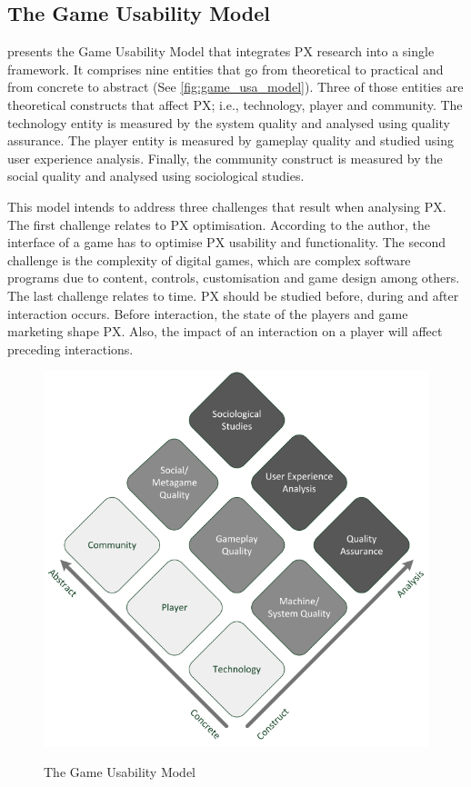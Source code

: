 \subsection{The Game Usability Model}
\textcite{Nacked} presents the Game Usability Model that integrates \ac{PX} research into a single framework. It comprises nine entities that go from theoretical to practical and from concrete to abstract (See \autoref{fig:game_usa_model}). Three of those entities are theoretical constructs that affect \ac{PX}; i.e., technology, player and community. The technology entity is measured by the system quality and analysed using quality assurance. The player entity is measured by gameplay quality and studied using user experience analysis. Finally, the community construct is measured by the social quality and analysed using sociological studies.

This model intends to address three challenges that result when analysing \ac{PX}. The first challenge relates to \ac{PX} optimisation. According to the author, the interface of a game has to optimise \ac{PX} usability and functionality. The second challenge is the complexity of digital games, which are complex software programs due to content, controls, customisation and game design among others. The last challenge relates to time. \ac{PX} should be studied before, during and after interaction occurs. Before interaction, the state of the players and game marketing shape \ac{PX}. Also, the impact of an interaction on a player will affect preceding interactions.

\begin{figure}[bth]
\myfloatalign
{\includegraphics[width=.6\linewidth]{gfx/model/game_usa_model}} \quad
\caption[The Game Usability Model]{The Game Usability Model \autocite{Nacked}}\label{fig:game_usa_model}
\end{figure}

